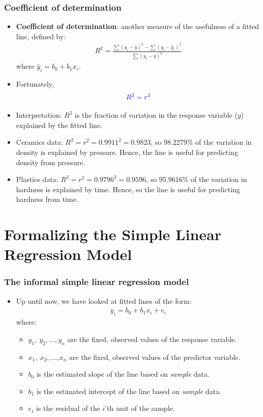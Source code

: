 \documentclass[handout]{beamer}\usepackage{graphicx, color}
\providecommand{\ov}[1]{\overline{#1}}
\providecommand{\wh}[1]{\widehat{#1}}
\numberwithin{equation}{section}
\begin{document}
\begin{frame}
\frametitle{Coefficient of determination} \small
\begin{itemize}
\item {\bf Coefficient of determination}: another measure of the usefulness of a fitted line, defined by:
\begin{align*}
R^2 = \frac{\sum(y_i - \ov{y})^2 - \sum(y_i - \wh{y}_i)^2}{\sum(y_i - \ov{y})^2}
\end{align*}
where $\wh{y}_i = b_0 + b_1 x_i$. 
\pause \item Fortunately,
\begin{align*} \color{blue}
R^2 = r^2
\end{align*}
\pause \item Interpretation: $R^2$ is the fraction of variation in the response variable ($y$) explained by the fitted line.
\pause \item Ceramics data: $R^2 = r^2 = 0.9911^2 = 0.9823$, so  98.2279\% of the variation in density is explained by pressure. Hence, the line is useful for predicting density from pressure.
\pause \item Plastics data: $R^2 = r^2 = 0.9796^2 = 0.9596$, so  95.9616\% of the variation in hardness is explained by time. Hence, so the line is useful for predicting hardness from time.
\end{itemize}
\end{frame}

\section{Formalizing the Simple Linear Regression Model}

\begin{frame}
\frametitle{The informal simple linear regression model}
\begin{itemize}
\item Up until now, we have looked at fitted lines of the form:
\begin{align*}
y_i = b_0 + b_1 x_i + e_i
\end{align*}
where:
\begin{itemize}
\pause \item $y_1, \ y_2, \ldots, y_n$ are the fixed, observed values of the response variable.
\pause \item $x_1, \ x_2, \ldots, x_n$ are the fixed, observed values of the predictor variable.
\pause \item $b_0$ is the estimated slope of the line based on \emph{sample} data.
\pause \item $b_1$ is the estimated intercept of the line based on \emph{sample} data.
\pause \item $e_i$ is the residual of the $i$'th unit of the sample.
\end{itemize}
\end{itemize}
\end{frame}
\end{document}
